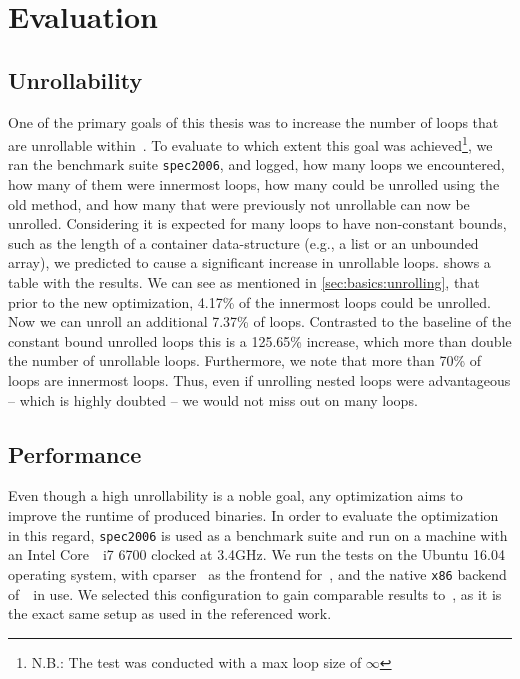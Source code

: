 \chapter{Evaluation}\label{sec:eval}

\section{Unrollability}\label{sec:eval:unrollability}

One of the primary goals of this thesis was to increase the number of loops that are unrollable within~\libFIRM.
To evaluate to which extent this goal was achieved\footnote{N.B.: The test was conducted with a max loop size of $\infty$}, we ran the benchmark suite \texttt{spec2006}, and  logged, how many loops we encountered, how many of them were innermost loops, how many could be unrolled using the old method, and how many that were previously not unrollable can now be unrolled.
Considering it is expected for many loops to have non-constant bounds, such as the length of a container data-structure (e.g., a list or an unbounded array), we predicted to cause a significant increase in unrollable loops.
 shows a table with the results.
We can see as mentioned in \cref{sec:basics:unrolling}, that prior to the new optimization, 4.17\% of the innermost loops could be unrolled.
Now we can unroll an additional 7.37\% of loops.
Contrasted to the baseline of the constant bound unrolled loops this is a 125.65\% increase, which more than double the number of unrollable loops.
Furthermore, we note that more than 70\% of loops are innermost loops.
Thus, even if unrolling nested loops were advantageous -- which is highly doubted -- we would not miss out on many loops.



\section{Performance}\label{sec:eval:perf}

Even though a high unrollability is a noble goal, any optimization aims to improve the runtime of produced binaries.
In order to evaluate the optimization in this regard, \texttt{spec2006} is used as a benchmark suite and run on a machine with an Intel Core~\textregistered~i7 6700 clocked at 3.4GHz.
We run the tests on the Ubuntu 16.04 operating system, with cparser~\cite{cparser} as the frontend for~\libFIRM, and the native \texttt{x86} backend of~\libFIRM~in use.
We selected this configuration to gain comparable results to~\cite{aebi18bachelorarbeit}, as it is the exact same setup as used in the referenced work.

